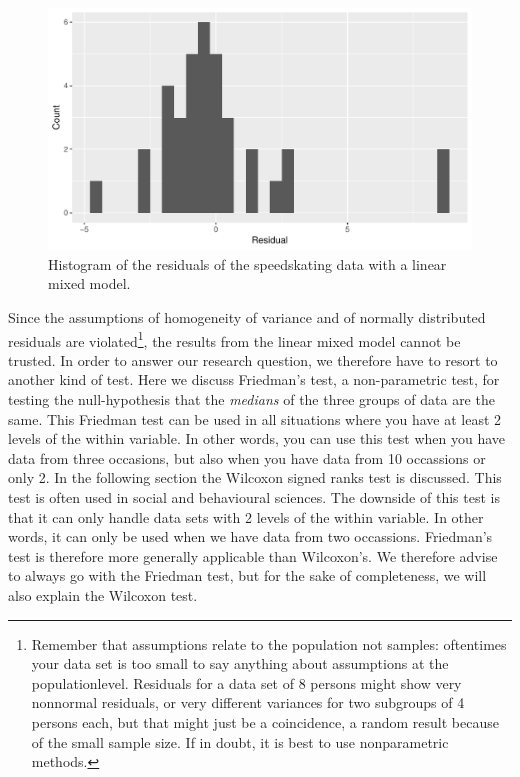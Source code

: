 \documentclass[]{report}\usepackage[]{graphicx}\usepackage[]{color}
\makeatletter
\def\maxwidth{ %
  \ifdim\Gin@nat@width>\linewidth
    \linewidth
  \else
    \Gin@nat@width
  \fi
}
\newenvironment{knitrout}{}{} %
\makeatother
\begin{document}
\begin{knitrout}
\color{fgcolor}\begin{figure}

{\centering \includegraphics[width=\maxwidth]{figure/nonparmixed_3-1} 

}

\caption[Histogram of the residuals of the speedskating data with a linear mixed model]{Histogram of the residuals of the speedskating data with a linear mixed model.}\label{fig:nonparmixed_3}
\end{figure}


\end{knitrout}
Since the assumptions of homogeneity of variance and of normally distributed residuals are violated\footnote{Remember that assumptions relate to the population not samples: oftentimes your data set is too small to say anything about assumptions at the populationlevel. Residuals for a data set of 8 persons might show very nonnormal residuals, or very different variances for two subgroups of 4 persons each, but that might just be a coincidence, a random result because of the small sample size. If in doubt, it is best to use nonparametric methods.}, the results from the linear mixed model cannot be trusted. In order to answer our research question, we therefore have to resort to another kind of test. Here we discuss Friedman's test, a non-parametric test, for testing the null-hypothesis that the \textit{medians} of the three groups of data are the same. This Friedman test can be used in all situations where you have at least 2 levels of the within variable. In other words, you can use this test when you have data from three occasions, but also when you have data from 10 occassions or only 2. In the following section the Wilcoxon signed ranks test is discussed. This test is often used in social and behavioural sciences. The downside of this test is that it can only handle data sets with 2 levels of the within variable. In other words, it can only be used when we have data from two occassions. Friedman's test is therefore more generally applicable than Wilcoxon's. We therefore advise to always go with the Friedman test, but for the sake of completeness, we will also explain the Wilcoxon test.
\end{document}
